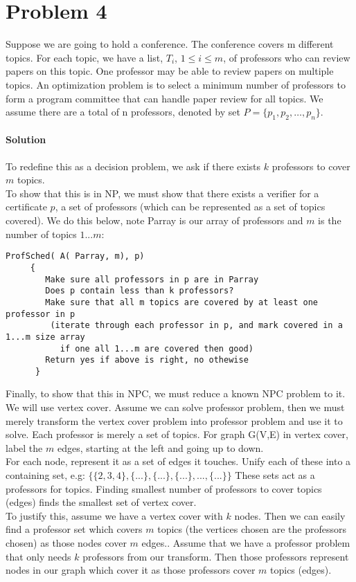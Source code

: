 \documentclass[12pt]{article}
\begin{document}
\section{Problem 4}
Suppose we are going to hold a conference. The conference covers m different topics. For each topic, we have a list, $T_i$, $1 \leq i \leq m$, of professors who can review papers on this topic. One professor may be able to review papers on multiple topics. An optimization problem is to select a minimum number of professors to form a program committee that can handle paper review for all topics. We assume there are a total of n professors, denoted by set $P = \{p_1, p_2, …, p_n\}$.

\paragraph{Solution}
To redefine this as a decision problem, we ask if there exists $k$ professors to cover $m$ topics.\\
To show that this is in NP, we must show that there exists a verifier for a certificate $p$, a set of professors (which can be represented as a set of topics covered). We do this below, note Parray is our array of professors and $m$ is the number of topics $1...m$: \\
\begin{lstlisting}
ProfSched( A( Parray, m), p)
     {
        Make sure all professors in p are in Parray
        Does p contain less than k professors?
        Make sure that all m topics are covered by at least one professor in p
         (iterate through each professor in p, and mark covered in a 1...m size array
           if one all 1...m are covered then good)
        Return yes if above is right, no othewise
      }

\end{lstlisting}


Finally, to show that this in NPC, we must reduce a known NPC problem to it.  We will use vertex cover.
Assume we can solve professor problem, then we must merely transform the vertex cover problem into professor problem and use it to solve.
      Each professor is merely a set of topics.      For graph G(V,E) in vertex cover, label the $m$ edges, starting at the left and going up to down.\\
      For each node, represent it as a set of edges it touches.  
      Unify each of these into a containing set, e.g: $\{ \{2,3,4\} , \{ ... \}, \{ ...\}, \{ ... \},..., \{ ... \} \}$
      These sets act as a professors for topics.
       Finding smallest number of professors to cover topics (edges) finds the smallest
     set of vertex cover.
\\
To justify this, assume we have a vertex cover with $k$ nodes.  Then we can easily find a professor set which covers $m$ topics (the vertices chosen are the professors chosen) as those nodes cover $m$ edges..
Assume that we have a professor problem that only needs $k$ professors from our transform.  Then those professors represent nodes in our graph which cover it as those professors cover $m$ topics (edges).
\end{document}
